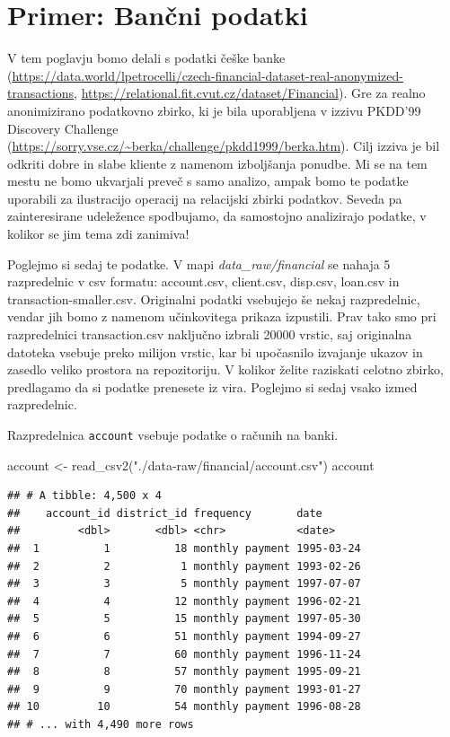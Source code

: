 \documentclass[
]{book}
\newenvironment{Shaded}{\begin{snugshade}}{\end{snugshade}}
\newcommand{\FunctionTok}[1]{\textcolor[rgb]{0.00,0.00,0.00}{#1}}
\newcommand{\NormalTok}[1]{#1}
\newcommand{\OtherTok}[1]{\textcolor[rgb]{0.56,0.35,0.01}{#1}}
\newcommand{\StringTok}[1]{\textcolor[rgb]{0.31,0.60,0.02}{#1}}
\begin{document}
\hypertarget{primer-banux10dni-podatki}{%
\section{Primer: Bančni podatki}\label{primer-banux10dni-podatki}}

V tem poglavju bomo delali s podatki češke banke (\url{https://data.world/lpetrocelli/czech-financial-dataset-real-anonymized-transactions}, \url{https://relational.fit.cvut.cz/dataset/Financial}). Gre za realno anonimizirano podatkovno zbirko, ki je bila uporabljena v izzivu PKDD'99 Discovery Challenge (\url{https://sorry.vse.cz/~berka/challenge/pkdd1999/berka.htm}). Cilj izziva je bil odkriti dobre in slabe kliente z namenom izboljšanja ponudbe. Mi se na tem mestu ne bomo ukvarjali preveč s samo analizo, ampak bomo te podatke uporabili za ilustracijo operacij na relacijski zbirki podatkov. Seveda pa zainteresirane udeležence spodbujamo, da samostojno analizirajo podatke, v kolikor se jim tema zdi zanimiva!

Poglejmo si sedaj te podatke. V mapi \emph{data\_raw/financial} se nahaja 5 razpredelnic v csv formatu: account.csv, client.csv, disp.csv, loan.csv in transaction-smaller.csv. Originalni podatki vsebujejo še nekaj razpredelnic, vendar jih bomo z namenom učinkovitega prikaza izpustili. Prav tako smo pri razpredelnici transaction.csv naključno izbrali 20000 vrstic, saj originalna datoteka vsebuje preko milijon vrstic, kar bi upočasnilo izvajanje ukazov in zasedlo veliko prostora na repozitoriju. V kolikor želite raziskati celotno zbirko, predlagamo da si podatke prenesete iz vira. Poglejmo si sedaj vsako izmed razpredelnic.

Razpredelnica \texttt{account} vsebuje podatke o računih na banki.

\begin{Shaded}
\begin{Highlighting}[]
\NormalTok{account }\OtherTok{\textless{}{-}} \FunctionTok{read\_csv2}\NormalTok{(}\StringTok{"./data{-}raw/financial/account.csv"}\NormalTok{)}
\NormalTok{account}
\end{Highlighting}
\end{Shaded}

\begin{verbatim}
## # A tibble: 4,500 x 4
##    account_id district_id frequency       date      
##         <dbl>       <dbl> <chr>           <date>    
##  1          1          18 monthly payment 1995-03-24
##  2          2           1 monthly payment 1993-02-26
##  3          3           5 monthly payment 1997-07-07
##  4          4          12 monthly payment 1996-02-21
##  5          5          15 monthly payment 1997-05-30
##  6          6          51 monthly payment 1994-09-27
##  7          7          60 monthly payment 1996-11-24
##  8          8          57 monthly payment 1995-09-21
##  9          9          70 monthly payment 1993-01-27
## 10         10          54 monthly payment 1996-08-28
## # ... with 4,490 more rows
\end{verbatim}
\end{document}
